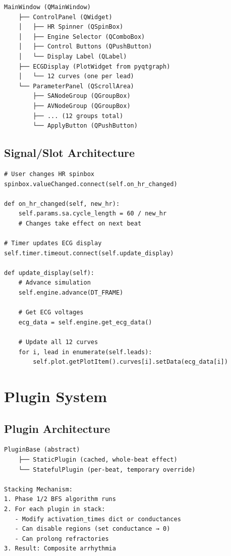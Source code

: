 \documentclass[11pt, a4paper]{article}
\begin{document}
\begin{verbatim}
MainWindow (QMainWindow)
    ├── ControlPanel (QWidget)
    │   ├── HR Spinner (QSpinBox)
    │   ├── Engine Selector (QComboBox)
    │   ├── Control Buttons (QPushButton)
    │   └── Display Label (QLabel)
    ├── ECGDisplay (PlotWidget from pyqtgraph)
    │   └── 12 curves (one per lead)
    └── ParameterPanel (QScrollArea)
        ├── SANodeGroup (QGroupBox)
        ├── AVNodeGroup (QGroupBox)
        ├── ... (12 groups total)
        └── ApplyButton (QPushButton)
\end{verbatim}

\subsection{Signal/Slot Architecture}

\begin{lstlisting}
# User changes HR spinbox
spinbox.valueChanged.connect(self.on_hr_changed)

def on_hr_changed(self, new_hr):
    self.params.sa.cycle_length = 60 / new_hr
    # Changes take effect on next beat

# Timer updates ECG display
self.timer.timeout.connect(self.update_display)

def update_display(self):
    # Advance simulation
    self.engine.advance(DT_FRAME)
    
    # Get ECG voltages
    ecg_data = self.engine.get_ecg_data()
    
    # Update all 12 curves
    for i, lead in enumerate(self.leads):
        self.plot.getPlotItem().curves[i].setData(ecg_data[i])
\end{lstlisting}

\section{Plugin System}

\subsection{Plugin Architecture}

\begin{verbatim}
PluginBase (abstract)
    ├── StaticPlugin (cached, whole-beat effect)
    └── StatefulPlugin (per-beat, temporary override)

Stacking Mechanism:
1. Phase 1/2 BFS algorithm runs
2. For each plugin in stack:
   - Modify activation_times dict or conductances
   - Can disable regions (set conductance → 0)
   - Can prolong refractories
3. Result: Composite arrhythmia
\end{verbatim}
\end{document}
